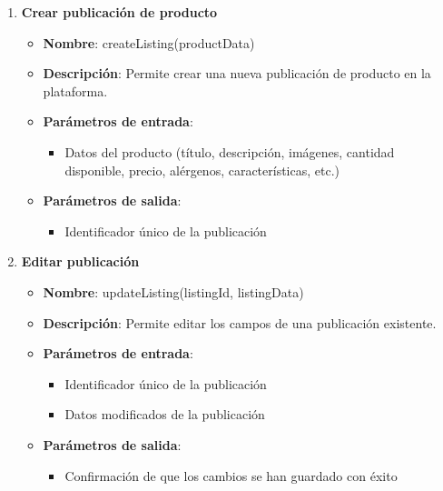 \begin{enumerate}[label=SOP-\protect\twodigits{\arabic*}:, align=left, leftmargin=*]
\item \textbf{Crear publicación de producto}
\begin{itemize}
\item \textbf{Nombre}: createListing(productData)
\item \textbf{Descripción}: Permite crear una nueva publicación de producto en la plataforma.
\item \textbf{Parámetros de entrada}:
\begin{itemize}
\item Datos del producto (título, descripción, imágenes, cantidad disponible, precio, alérgenos, características, etc.)
\end{itemize}
\item \textbf{Parámetros de salida}:
\begin{itemize}
\item Identificador único de la publicación
\end{itemize}
\end{itemize}

\item \textbf{Editar publicación}
\begin{itemize}
\item \textbf{Nombre}: updateListing(listingId, listingData)
\item \textbf{Descripción}: Permite editar los campos de una publicación existente.
\item \textbf{Parámetros de entrada}:
\begin{itemize}
\item Identificador único de la publicación
\item Datos modificados de la publicación
\end{itemize}
\item \textbf{Parámetros de salida}:
\begin{itemize}
\item Confirmación de que los cambios se han guardado con éxito
\end{itemize}
\end{itemize}


\end{enumerate}
